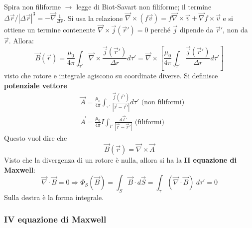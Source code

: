 \documentclass[10pt, a4paper]{scrartcl}
\numberwithin{equation}{subsection}
\theoremstyle{style1}
\begin{document}
Spira non filiforme $\to$ legge di Biot-Savart non filiforme; il termine $\Delta \vec{r} / \left\lvert \Delta \vec{r} \right\rvert ^3 = -\vec{\nabla } \frac{1}{\Delta r}$. Si usa la relazione $\vec{\nabla }\times (f \vec{v}) = f\vec{\nabla }\times \vec{v} + \vec{\nabla }f \times \vec{v}$ e si ottiene un termine contenente $\vec{\nabla }\times \vec{j}(\vec{r}') =0$ perch\'e $\vec{j}$ dipende da $\vec{r}' $, non da $\vec{r}$. Allora:
\begin{equation}
	\vec{B}(\vec{r}) = \frac{\mu_0}{4 \pi }\int_{\tau '} \vec{\nabla }\times \frac{\vec{j}(\vec{r}')}{\Delta r}d\tau ' = \vec{\nabla }\times \left[ \frac{\mu_0}{4\pi}\int_{\tau '} \frac{\vec{j}(\vec{r}')}{\Delta r }d\tau ' \right] 
\end{equation}
visto che rotore e integrale agiscono su coordinate diverse. Si definisce \textbf{potenziale vettore} 
\begin{equation}
	\begin{split}
		&\vec{A} = \frac{\mu_0}{4 \pi }\int_{\tau '} \frac{\vec{j}(\vec{r}') }{\left\lvert \vec{r}-\vec{r}' \right\rvert }d\tau ' \text{ (non filiformi}) \\
		&\vec{A} = \frac{\mu_0}{4 \pi }I\int_{l '} \frac{d\vec{l}' }{\left\lvert \vec{r}-\vec{r}' \right\rvert }  \text{ (filiformi}) 
	\end{split}
\end{equation}
Questo vuol dire che
\begin{equation}
	\vec{B}(\vec{r}) = \vec{\nabla }\times \vec{A}
\end{equation}
Visto che la divergenza di un rotore \`e nulla, allora si ha la \textbf{II equazione di Maxwell}:
\begin{equation}
	\vec{\nabla }\cdot \vec{B} = 0 \Rightarrow \Phi_S (\vec{B}) = \int_{S} \vec{B}\cdot d\vec{S} = \int_{\tau } (\vec{\nabla }\cdot \vec{B}) \ d\tau ' = 0
\end{equation}
Sulla destra \`e la forma integrale.
\subsubsection{IV equazione di Maxwell}
\end{document}
